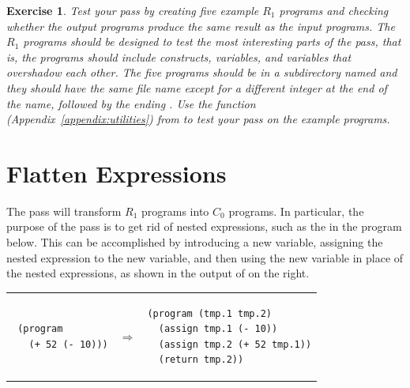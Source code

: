 \documentclass[11pt]{book}
\newtheorem{exercise}[theorem]{Exercise}
\begin{document}
\begin{exercise}
\normalfont %

Test your  pass by creating five example $R_1$ programs
and checking whether the output programs produce the same result as
the input programs. The $R_1$ programs should be designed to test the
most interesting parts of the  pass, that is, the
programs should include  constructs, variables, and variables
that overshadow each other.  The five programs should be in a
subdirectory named  and they should have the same file name
except for a different integer at the end of the name, followed by the
ending .  Use the  function
(Appendix~\ref{appendix:utilities}) from  to test
your  pass on the example programs.

\end{exercise}


\section{Flatten Expressions}
\label{sec:flatten-r1}

The  pass will transform $R_1$ programs into $C_0$
programs. In particular, the purpose of the  pass is to
get rid of nested expressions, such as the  in the program
below. This can be accomplished by introducing a new variable,
assigning the nested expression to the new variable, and then using
the new variable in place of the nested expressions, as shown in the
output of  on the right.\\
\begin{tabular}{lll}
\begin{minipage}{0.4\textwidth}
\begin{lstlisting}
 (program
   (+ 52 (- 10)))
\end{lstlisting}
\end{minipage}
&
$\Rightarrow$
&
\begin{minipage}{0.4\textwidth}
\begin{lstlisting}
(program (tmp.1 tmp.2)
  (assign tmp.1 (- 10))
  (assign tmp.2 (+ 52 tmp.1))
  (return tmp.2))
\end{lstlisting}
\end{minipage}
\end{tabular}
\end{document}
